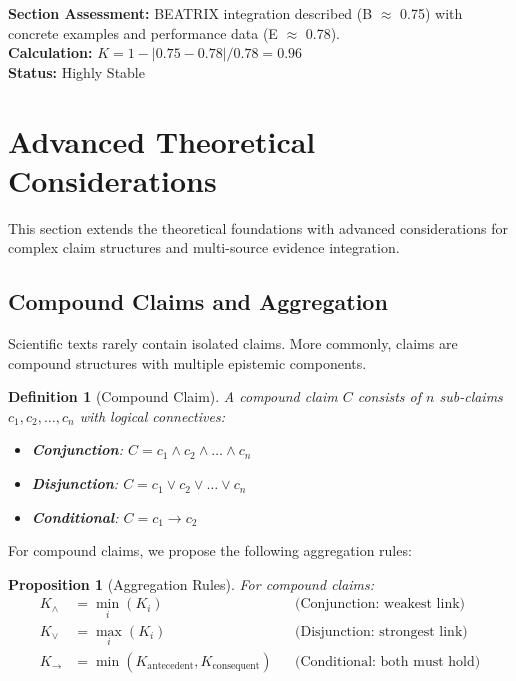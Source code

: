 \documentclass[11pt,a4paper]{article}
\newtheorem{definition}{Definition}[section]
\newtheorem{proposition}{Proposition}[section]
\begin{document}
\begin{eslbox}
\textbf{Section Assessment:} BEATRIX integration described (B $\approx$ 0.75) with concrete examples and performance data (E $\approx$ 0.78). \\[0.3em]
\textbf{Calculation:} $K = 1 - |0.75 - 0.78| / 0.78 = 0.96$ \\
\textbf{Status:} Highly Stable
\end{eslbox}

\section{Advanced Theoretical Considerations}
\label{sec:advanced}


This section extends the theoretical foundations with advanced considerations for complex claim structures and multi-source evidence integration.

\subsection{Compound Claims and Aggregation}

Scientific texts rarely contain isolated claims. More commonly, claims are compound structures with multiple epistemic components.

\begin{definition}[Compound Claim]
\label{def:compound}
A compound claim $C$ consists of $n$ sub-claims $c_1, c_2, \ldots, c_n$ with logical connectives:
\begin{itemize}
    \item \textbf{Conjunction}: $C = c_1 \land c_2 \land \ldots \land c_n$
    \item \textbf{Disjunction}: $C = c_1 \lor c_2 \lor \ldots \lor c_n$
    \item \textbf{Conditional}: $C = c_1 \rightarrow c_2$
\end{itemize}
\end{definition}

For compound claims, we propose the following aggregation rules:

\begin{proposition}[Aggregation Rules]
\label{prop:aggregation}
For compound claims:
\begin{align}
K_{\land} &= \min_i(K_i) && \text{(Conjunction: weakest link)} \\
K_{\lor} &= \max_i(K_i) && \text{(Disjunction: strongest link)} \\
K_{\rightarrow} &= \min(K_{\text{antecedent}}, K_{\text{consequent}}) && \text{(Conditional: both must hold)}
\end{align}
\end{proposition}
\end{document}
